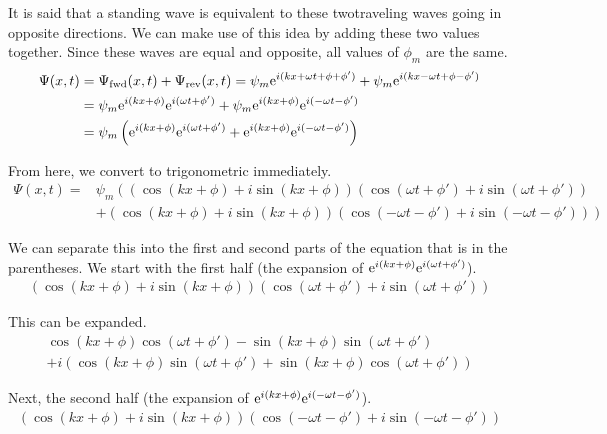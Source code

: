 \documentclass[12pt]{article}
\newcommand{\e}[1]{{\rm e}^{#1}}
\begin{document}
    It is said that a standing wave is equivalent to these twotraveling waves going in opposite directions.
    We can make use of this idea by adding these two values together.
    Since these waves are equal and opposite, all values of $\phi_m$ are the same.
    \begin{align}
        \Psi(x,t)   &=  \Psi_{\rm fwd}(x,t) + \Psi_{\rm rev}(x,t)
            =   \psi_m \e{i(kx + \omega t + \phi + \phi')} + \psi_m \e{i(kx - \omega t + \phi - \phi')}\\
            &=  \psi_m \e{i(kx + \phi)} \e{i(\omega t + \phi')} + \psi_m \e{i(kx + \phi)} \e{i(-\omega t - \phi')}\\
            &=  \psi_m \left( \e{i(kx + \phi)} \e{i(\omega t + \phi')} + \e{i(kx + \phi)} \e{i(-\omega t - \phi')} \right)
    \end{align}
    
    From here, we convert to trigonometric immediately.
    \begin{align}
        \Psi(x,t)   =   &\psi_m \left( \left( \cos(kx + \phi) + i\sin(kx + \phi) \right) \left( \cos(\omega t + \phi') + i\sin(\omega t + \phi') \right) \right.\\ &\left.+ \left( \cos(kx + \phi) + i\sin(kx + \phi) \right) \left( \cos(-\omega t - \phi') + i\sin(-\omega t - \phi') \right) \right)
    \end{align}

    We can separate this into the first and second parts of the equation that is in the parentheses.
    We start with the first half (the expansion of $\e{i(kx + \phi)} \e{i(\omega t + \phi')}$). 
    \begin{gather}
        \left( \cos(kx + \phi) + i\sin(kx + \phi) \right) \left( \cos(\omega t + \phi') + i\sin(\omega t + \phi') \right)
    \end{gather}

    This can be expanded. 
    \begin{multline}
        \cos(kx + \phi)\cos(\omega t + \phi') - \sin(kx + \phi)\sin(\omega t + \phi')\\
            +   i\left( \cos(kx + \phi)\sin(\omega t + \phi') + \sin(kx + \phi)\cos(\omega t + \phi') \right)
    \end{multline}

    Next, the second half (the expansion of $\e{i(kx + \phi)} \e{i(-\omega t - \phi')}$). 
    \begin{gather}
        \left( \cos(kx + \phi) + i\sin(kx + \phi) \right) \left( \cos(-\omega t - \phi') + i\sin(-\omega t - \phi') \right)
    \end{gather}
\end{document}

